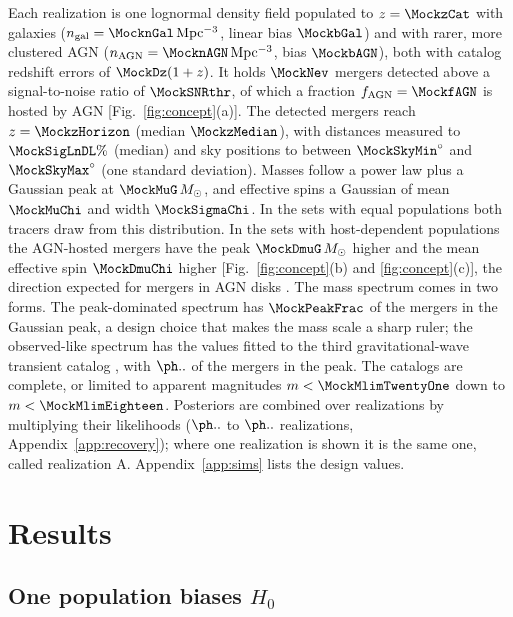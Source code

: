 \documentclass[aps,prd,reprint,superscriptaddress,nofootinbib,nolongbibliography,floatfix]{revtex4-2}
\newcommand{\Msun}{M_\odot}
\newcommand{\fagn}{f_{\rm AGN}}
\begin{document}
Each realization is one lognormal density field \cite{Tessore:2023zyk} populated to $z=\MockzCat$ with galaxies ($n_{\rm gal}=\MocknGal\,{\rm Mpc^{-3}}$, linear bias $\MockbGal$) and with rarer, more clustered AGN ($n_{\rm AGN}=\MocknAGN\,{\rm Mpc^{-3}}$, bias $\MockbAGN$), both with catalog redshift errors of $\MockDz(1+z)$.
It holds $\MockNev$ mergers detected above a signal-to-noise ratio of $\MockSNRthr$, of which a fraction $\fagn=\MockfAGN$ is hosted by AGN [Fig.~\ref{fig:concept}(a)].
The detected mergers reach $z=\MockzHorizon$ (median $\MockzMedian$), with distances measured to $\MockSigLnDL\%$ (median) and sky positions to between $\MockSkyMin^\circ$ and $\MockSkyMax^\circ$ (one standard deviation).
Masses follow a power law plus a Gaussian peak at $\MockMuG\,\Msun$, and effective spins a Gaussian of mean $\MockMuChi$ and width $\MockSigmaChi$.
In the sets with equal populations both tracers draw from this distribution.
In the sets with host-dependent populations the AGN-hosted mergers have the peak $\MockDmuG\,\Msun$ higher and the mean effective spin $\MockDmuChi$ higher [Fig.~\ref{fig:concept}(b) and \ref{fig:concept}(c)], the direction expected for mergers in AGN disks \cite{Yang:2019cbr,Tagawa:2021ofj}.
The mass spectrum comes in two forms.
The peak-dominated spectrum has $\MockPeakFrac$ of the mergers in the Gaussian peak, a design choice that makes the mass scale a sharp ruler; the observed-like spectrum has the values fitted to the third gravitational-wave transient catalog \cite{KAGRA:2021duu}, with $\ObsPeakFrac$ of the mergers in the peak.
The catalogs are complete, or limited to apparent magnitudes $m<\MockMlimTwentyOne$ down to $m<\MockMlimEighteen$.
Posteriors are combined over realizations by multiplying their likelihoods ($\NrealHD$ to $\NrealSingle$ realizations, Appendix~\ref{app:recovery}); where one realization is shown it is the same one, called realization A.
Appendix~\ref{app:sims} lists the design values.

\section{Results}
\label{sec:results}

\subsection{One population biases \texorpdfstring{$H_0$}{H0}}
\label{sec:bias}
\end{document}
